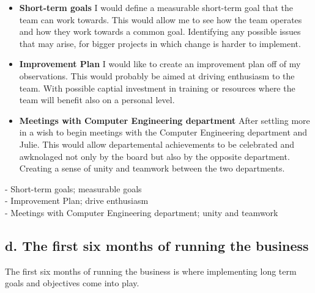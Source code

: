\documentclass{article}
\begin{document}
\begin{itemize}
    \item \textbf{Short-term goals} I would define a measurable short-term goal that the team can work towards. This would allow me to see how the team operates and how they work towards a common goal. Identifying any possible issues that may arise, for bigger projects in which change is harder to implement. \\
    \item \textbf{Improvement Plan} I would like to create an improvement plan off of my observations. This would probably be aimed at driving enthusiasm to the team. With possible captial investment in training or resources where the team will benefit also on a personal level. \\
    \item \textbf{Meetings with Computer Engineering department} After settling more in a wish to begin meetings with the Computer Engineering department and Julie. This would allow departemental achievements to be celebrated and awknolaged not only by the board but also by the opposite department. Creating a sense of unity and teamwork between the two departments. \\
\end{itemize}
- Short-term goals; measurable goals \\
- Improvement Plan; drive enthusiasm \\
- Meetings with Computer Engineering department; unity and teamwork \\

\subsection{d. The first six months of running the business}
The first six months of running the business is where implementing long term goals and objectives come into play. \\
\end{document}
